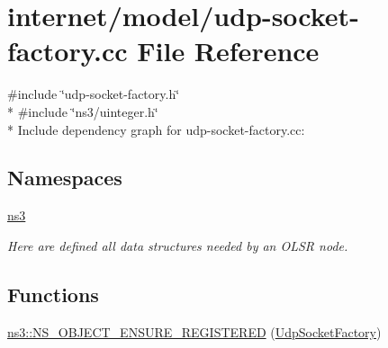 \hypertarget{udp-socket-factory_8cc}{}\section{internet/model/udp-\/socket-\/factory.cc File Reference}
\label{udp-socket-factory_8cc}
{\ttfamily \#include \char`\"{}udp-\/socket-\/factory.\+h\char`\"{}}\\*
{\ttfamily \#include \char`\"{}ns3/uinteger.\+h\char`\"{}}\\*
Include dependency graph for udp-\/socket-\/factory.cc\+:
\subsection*{Namespaces}
\begin{DoxyCompactItemize}
\item 
 \hyperlink{namespacens3}{ns3}
\begin{DoxyCompactList}\small\item\em Here are defined all data structures needed by an O\+L\+SR node. \end{DoxyCompactList}\end{DoxyCompactItemize}
\subsection*{Functions}
\begin{DoxyCompactItemize}
\item 
\hyperlink{namespacens3_a1ba82958678e909849b3bae4dc804ecb}{ns3\+::\+N\+S\+\_\+\+O\+B\+J\+E\+C\+T\+\_\+\+E\+N\+S\+U\+R\+E\+\_\+\+R\+E\+G\+I\+S\+T\+E\+R\+ED} (\hyperlink{classns3_1_1UdpSocketImpl_afba47205bf14e005b7444bb89be13029}{Udp\+Socket\+Factory})
\end{DoxyCompactItemize}
